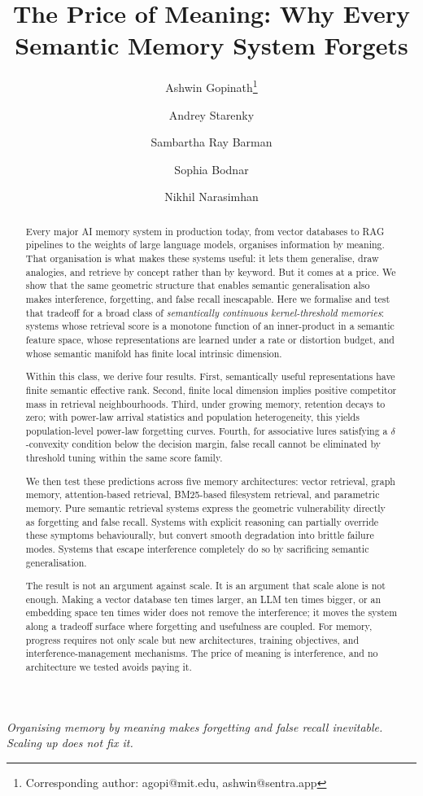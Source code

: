 \documentclass[11pt]{article}
\title{\textbf{The Price of Meaning: Why Every Semantic Memory System Forgets}}
\author[1,2]{Ashwin Gopinath\thanks{Corresponding author: agopi@mit.edu, ashwin@sentra.app}}
\author[1]{Andrey Starenky}
\author[1]{Sambartha Ray Barman}
\author[1]{Sophia Bodnar}
\author[1]{Nikhil Narasimhan}
\affil[1]{Sentra.app, 235 2nd Street, San Francisco, CA 94105, USA}
\affil[2]{Department of Mechanical Engineering, Massachusetts Institute of Technology, 77 Massachusetts Avenue, Cambridge, MA 02139, USA}
\date{}
\newcommand{\subtitle}[1]{\vspace{-0.5em}\begin{center}\large\textit{#1}\end{center}\vspace{0.5em}}
\begin{document}
\maketitle
\subtitle{Organising memory by meaning makes forgetting and false recall inevitable. Scaling up does not fix it.}

\begin{abstract}
\noindent
Every major AI memory system in production today, from vector databases to RAG pipelines to the weights of large language models, organises information by meaning. That organisation is what makes these systems useful: it lets them generalise, draw analogies, and retrieve by concept rather than by keyword. But it comes at a price. We show that the same geometric structure that enables semantic generalisation also makes interference, forgetting, and false recall inescapable. Here we formalise and test that tradeoff for a broad class of \textit{semantically continuous kernel-threshold memories}: systems whose retrieval score is a monotone function of an inner-product in a semantic feature space, whose representations are learned under a rate or distortion budget, and whose semantic manifold has finite local intrinsic dimension.

Within this class, we derive four results. First, semantically useful representations have finite semantic effective rank. Second, finite local dimension implies positive competitor mass in retrieval neighbourhoods. Third, under growing memory, retention decays to zero; with power-law arrival statistics and population heterogeneity, this yields population-level power-law forgetting curves. Fourth, for associative lures satisfying a $\delta$-convexity condition below the decision margin, false recall cannot be eliminated by threshold tuning within the same score family.

We then test these predictions across five memory architectures: vector retrieval, graph memory, attention-based retrieval, BM25-based filesystem retrieval, and parametric memory. Pure semantic retrieval systems express the geometric vulnerability directly as forgetting and false recall. Systems with explicit reasoning can partially override these symptoms behaviourally, but convert smooth degradation into brittle failure modes. Systems that escape interference completely do so by sacrificing semantic generalisation.

The result is not an argument against scale. It is an argument that scale alone is not enough. Making a vector database ten times larger, an LLM ten times bigger, or an embedding space ten times wider does not remove the interference; it moves the system along a tradeoff surface where forgetting and usefulness are coupled. For memory, progress requires not only scale but new architectures, training objectives, and interference-management mechanisms. The price of meaning is interference, and no architecture we tested avoids paying it.
\end{abstract}
\end{document}
